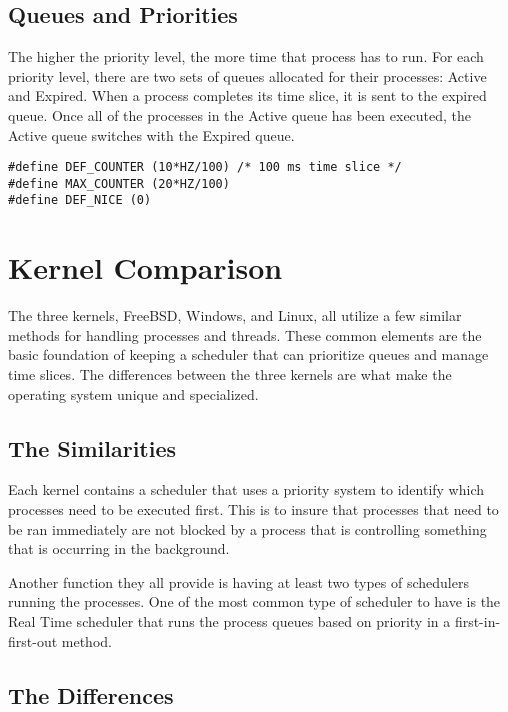 \documentclass[10pt, draftclsnofoot,onecolumn]{IEEEtran}
\begin{document}
\subsection{Queues and Priorities}

The higher the priority level, the more time that process has to run. For each priority level, there are two sets of queues allocated for their processes: Active and Expired. When a process completes its time slice, it is sent to the expired queue. Once all of the processes in the Active queue has been executed,  the Active queue switches with the Expired queue.

\begin{lstlisting}[caption={ the default, max, and nice() time slice },label={lst:label}]
#define DEF_COUNTER (10*HZ/100) /* 100 ms time slice */
#define MAX_COUNTER (20*HZ/100)
#define DEF_NICE (0)
\end{lstlisting}


\section{Kernel Comparison}

The three kernels, FreeBSD, Windows, and Linux, all utilize a few similar methods for handling processes and threads. These common elements are the basic foundation of keeping a scheduler that can prioritize queues and manage time slices. The differences between the three kernels are what make the operating system unique and specialized.

\subsection{The Similarities}

Each kernel contains a scheduler that uses a priority system to identify which processes need to be executed first. This is to insure that processes that need to be ran immediately are not blocked by a process that is controlling something that is occurring in the background.\par
Another function they all provide is having at least two types of schedulers running the processes. One of the most common type of scheduler to have is the Real Time scheduler that runs the process queues based on priority in a first-in-first-out method.\par

\subsection{The Differences}
\end{document}
